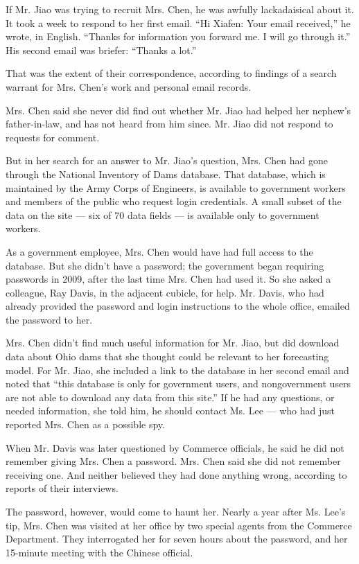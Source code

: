 If Mr. Jiao was trying to recruit Mrs. Chen, he was awfully
lackadaisical about it. It took a week to respond to her first email.
``Hi Xiafen: Your email received,'' he wrote, in English. ``Thanks for
information you forward me. I will go through it.'' His second email was
briefer: ``Thanks a lot.''

That was the extent of their correspondence, according to findings of a
search warrant for Mrs. Chen's work and personal email records.

Mrs. Chen said she never did find out whether Mr. Jiao had helped her
nephew's father-in-law, and has not heard from him since. Mr. Jiao did
not respond to requests for comment.

But in her search for an answer to Mr. Jiao's question, Mrs. Chen had
gone through the National Inventory of Dams database. That database,
which is maintained by the Army Corps of Engineers, is available to
government workers and members of the public who request login
credentials. A small subset of the data on the site --- six of 70 data
fields --- is available only to government workers.

As a government employee, Mrs. Chen would have had full access to the
database. But she didn't have a password; the government began requiring
passwords in 2009, after the last time Mrs. Chen had used it. So she
asked a colleague, Ray Davis, in the adjacent cubicle, for help. Mr.
Davis, who had already provided the password and login instructions to
the whole office, emailed the password to her.

Mrs. Chen didn't find much useful information for Mr. Jiao, but did
download data about Ohio dams that she thought could be relevant to her
forecasting model. For Mr. Jiao, she included a link to the database in
her second email and noted that ``this database is only for government
users, and nongovernment users are not able to download any data from
this site.'' If he had any questions, or needed information, she told
him, he should contact Ms. Lee --- who had just reported Mrs. Chen as a
possible spy.

When Mr. Davis was later questioned by Commerce officials, he said he
did not remember giving Mrs. Chen a password. Mrs. Chen said she did not
remember receiving one. And neither believed they had done anything
wrong, according to reports of their interviews.

The password, however, would come to haunt her. Nearly a year after Ms.
Lee's tip, Mrs. Chen was visited at her office by two special agents
from the Commerce Department. They interrogated her for seven hours
about the password, and her 15-minute meeting with the Chinese official.

